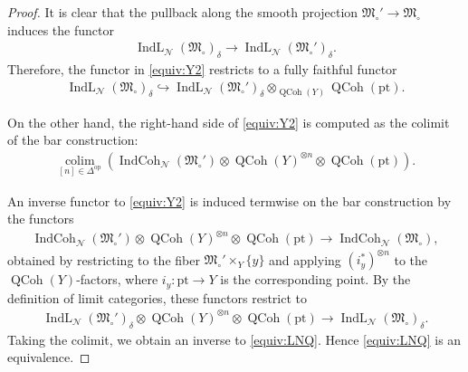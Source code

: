 \documentclass[11pt,oneside,a4paper,mathscr]{amsart}
\theoremstyle{definition}
\newcommand{\QCoh}{\operatorname{QCoh}}
\newcommand{\IndCoh}{\operatorname{IndCoh}}
\newcommand{\IndL}{\operatorname{IndL}}
\begin{document}
\begin{proof}
It is clear that the pullback along the smooth projection
$\mathfrak{M}_{\circ}'\to \mathfrak{M}_{\circ}$
induces the functor 
\begin{align*}
    \IndL_{\mathcal{N}}(\mathfrak{M}_{\circ})_{\delta} \to 
    \IndL_{\mathcal{N}}(\mathfrak{M}_{\circ}')_{\delta}.
\end{align*}
Therefore, the functor in \eqref{equiv:Y2}
restricts to a fully faithful functor
\begin{align}\label{equiv:LNQ}
\IndL_{\mathcal{N}}(\mathfrak{M}_{\circ})_{\delta}
\hookrightarrow
\IndL_{\mathcal{N}}(\mathfrak{M}_{\circ}')_{\delta}
\otimes_{\QCoh(Y)}
\QCoh(\mathrm{pt}).
\end{align}

On the other hand, the right-hand side of \eqref{equiv:Y2} is computed
as the colimit of the bar construction:
\begin{align}\label{bar:Y:colim}
\operatorname*{colim}_{[n]\in \Delta^{\mathrm{op}}}
\left(
\IndCoh_{\mathcal{N}}(\mathfrak{M}_{\circ}')
\otimes
\QCoh(Y)^{\otimes n}
\otimes
\QCoh(\mathrm{pt})
\right).
\end{align}

An inverse functor to \eqref{equiv:Y2} is induced termwise on the bar
construction by the functors
\begin{align*}
\IndCoh_{\mathcal{N}}(\mathfrak{M}_{\circ}')
\otimes
\QCoh(Y)^{\otimes n}
\otimes
\QCoh(\mathrm{pt})
\longrightarrow
\IndCoh_{\mathcal{N}}(\mathfrak{M}_{\circ}),
\end{align*}
obtained by restricting to the fiber
$\mathfrak{M}_{\circ}'\times_Y \{y\}$ and applying $(i_y^*)^{\otimes n}$
to the $\QCoh(Y)$-factors, where $i_y\colon \mathrm{pt}\to Y$ is the
corresponding point. By the definition of limit categories, these functors
restrict to
\begin{align*}
\IndL_{\mathcal{N}}(\mathfrak{M}_{\circ}')_{\delta}
\otimes
\QCoh(Y)^{\otimes n}
\otimes
\QCoh(\mathrm{pt})
\longrightarrow
\IndL_{\mathcal{N}}(\mathfrak{M}_{\circ})_{\delta}.
\end{align*}
Taking the colimit, we obtain an inverse to
\eqref{equiv:LNQ}. Hence \eqref{equiv:LNQ} is an equivalence.
\end{proof}
\end{document}
